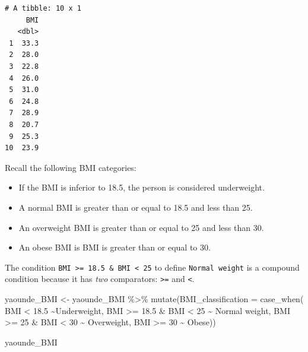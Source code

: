 \documentclass[
  letterpaper,
  DIV=11,
  numbers=noendperiod]{scrreprt}
\newenvironment{Shaded}{\begin{snugshade}}{\end{snugshade}}
\newcommand{\AttributeTok}[1]{\textcolor[rgb]{0.40,0.45,0.13}{#1}}
\newcommand{\DecValTok}[1]{\textcolor[rgb]{0.68,0.00,0.00}{#1}}
\newcommand{\FloatTok}[1]{\textcolor[rgb]{0.68,0.00,0.00}{#1}}
\newcommand{\FunctionTok}[1]{\textcolor[rgb]{0.28,0.35,0.67}{#1}}
\newcommand{\NormalTok}[1]{\textcolor[rgb]{0.00,0.23,0.31}{#1}}
\newcommand{\OtherTok}[1]{\textcolor[rgb]{0.00,0.23,0.31}{#1}}
\newcommand{\SpecialCharTok}[1]{\textcolor[rgb]{0.37,0.37,0.37}{#1}}
\newcommand{\StringTok}[1]{\textcolor[rgb]{0.13,0.47,0.30}{#1}}
\begin{document}
\begin{verbatim}
# A tibble: 10 x 1
     BMI
   <dbl>
 1  33.3
 2  28.0
 3  22.8
 4  26.0
 5  31.0
 6  24.8
 7  28.9
 8  20.7
 9  25.3
10  23.9
\end{verbatim}

Recall the following BMI categories:

\begin{itemize}
\item
  If the BMI is inferior to 18.5, the person is considered underweight.
\item
  A normal BMI is greater than or equal to 18.5 and less than 25.
\item
  An overweight BMI is greater than or equal to 25 and less than 30.
\item
  An obese BMI is BMI is greater than or equal to 30.
\end{itemize}

The condition
\texttt{BMI\ \textgreater{}=\ 18.5\ \&\ BMI\ \textless{}\ 25} to define
\texttt{Normal\ weight} is a compound condition because it has
\emph{two} comparators: \texttt{\textgreater{}=} and
\texttt{\textless{}}.

\begin{Shaded}
\begin{Highlighting}[]
\NormalTok{yaounde\_BMI }\OtherTok{\textless{}{-}}
\NormalTok{  yaounde\_BMI }\SpecialCharTok{\%\textgreater{}\%}
  \FunctionTok{mutate}\NormalTok{(}\AttributeTok{BMI\_classification =} \FunctionTok{case\_when}\NormalTok{(}
\NormalTok{    BMI }\SpecialCharTok{\textless{}} \FloatTok{18.5} \SpecialCharTok{\textasciitilde{}}\StringTok{\textquotesingle{}Underweight\textquotesingle{}}\NormalTok{,}
\NormalTok{    BMI }\SpecialCharTok{\textgreater{}=} \FloatTok{18.5} \SpecialCharTok{\&}\NormalTok{ BMI }\SpecialCharTok{\textless{}} \DecValTok{25} \SpecialCharTok{\textasciitilde{}} \StringTok{\textquotesingle{}Normal weight\textquotesingle{}}\NormalTok{,}
\NormalTok{    BMI }\SpecialCharTok{\textgreater{}=} \DecValTok{25} \SpecialCharTok{\&}\NormalTok{ BMI }\SpecialCharTok{\textless{}} \DecValTok{30} \SpecialCharTok{\textasciitilde{}} \StringTok{\textquotesingle{}Overweight\textquotesingle{}}\NormalTok{,}
\NormalTok{    BMI }\SpecialCharTok{\textgreater{}=} \DecValTok{30} \SpecialCharTok{\textasciitilde{}} \StringTok{\textquotesingle{}Obese\textquotesingle{}}\NormalTok{))}

\NormalTok{yaounde\_BMI}
\end{Highlighting}
\end{Shaded}
\end{document}

